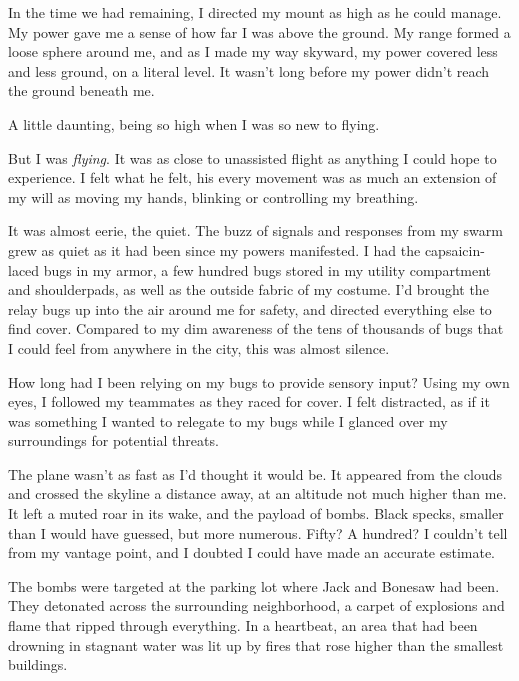 





In the time we had remaining, I directed my mount as high as he could manage.  My power gave me a sense of how far I was above the ground.  My range formed a loose sphere around me, and as I made my way skyward, my power covered less and less ground, on a literal level.  It wasn't long before my power didn't reach the ground beneath me.



A little daunting, being so high when I was so new to flying.



But I was \emph{flying}.  It was as close to unassisted flight as anything I could hope to experience.  I felt what he felt, his every movement was as much an extension of my will as moving my hands, blinking or controlling my breathing.



It was almost eerie, the quiet.  The buzz of signals and responses from my swarm grew as quiet as it had been since my powers manifested.  I had the capsaicin-laced bugs in my armor, a few hundred bugs stored in my utility compartment and shoulderpads, as well as the outside fabric of my costume.  I'd brought the relay bugs up into the air around me for safety, and directed everything else to find cover.  Compared to my dim awareness of the tens of thousands of bugs that I could feel from anywhere in the city, this was almost silence.



How long had I been relying on my bugs to provide sensory input?  Using my own eyes, I followed my teammates as they raced for cover.  I felt distracted, as if it was something I wanted to relegate to my bugs while I glanced over my surroundings for potential threats.



The plane wasn't as fast as I'd thought it would be.  It appeared from the clouds and crossed the skyline a distance away, at an altitude not much higher than me.  It left a muted roar in its wake, and the payload of bombs.  Black specks, smaller than I would have guessed, but more numerous.  Fifty?  A hundred?  I couldn't tell from my vantage point, and I doubted I could have made an accurate estimate.



The bombs were targeted at the parking lot where Jack and Bonesaw had been.  They detonated across the surrounding neighborhood, a carpet of explosions and flame that ripped through everything.  In a heartbeat, an area that had been drowning in stagnant water was lit up by fires that rose higher than the smallest buildings.



